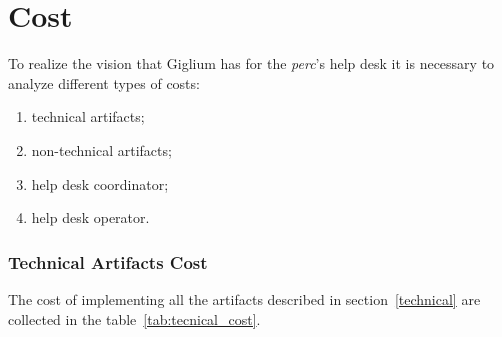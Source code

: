 \clearpage
\section{Cost}\label{cost}
To realize the vision that Giglium has for the \textit{\gls{perc}}'s help desk it is necessary to analyze different types of costs:
\begin{enumerate}
	\item technical artifacts;
	\item non-technical artifacts;
	\item help desk coordinator;
	\item help desk operator.
\end{enumerate}

\subsubsection{Technical Artifacts Cost}
The cost of implementing all the artifacts described in section~\ref{technical} are collected in the table~\ref{tab:tecnical_cost}.

